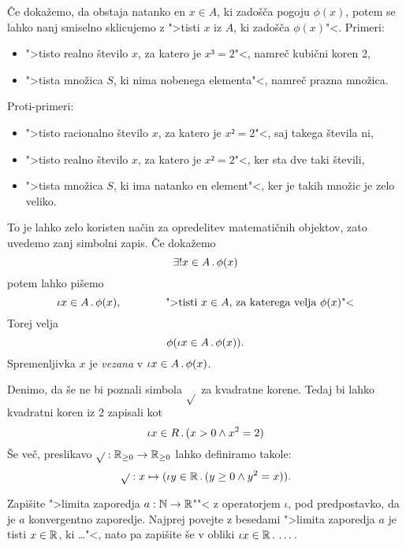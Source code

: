 Če dokažemo, da obstaja natanko en $x \in A$, ki zadošča pogoju $\phi(x)$, potem se lahko nanj smiselno sklicujemo z ">tisti $x$ iz $A$, ki zadošča $\phi(x)$"<. Primeri:
%
\begin{itemize}
\item ">tisto realno število $x$, za katero je $x³ = 2$"<, namreč kubični koren 2,
\item ">tista množica $S$, ki nima nobenega elementa"<, namreč prazna množica.
\end{itemize}
%
Proti-primeri:
%
\begin{itemize}
\item ">tisto racionalno število $x$, za katero je $x² = 2$"<, saj takega števila ni,
\item ">tisto realno število $x$, za katero je $x² = 2$"<, ker sta dve taki števili,
\item ">tista množica $S$, ki ima natanko en element"<, ker je takih množic je zelo veliko.
\end{itemize}
%
To je lahko zelo koristen način za opredelitev matematičnih objektov, zato uvedemo zanj simbolni zapis. Če dokažemo
%
\begin{equation*}
    \exists! x \in A \,.\, \phi(x)
\end{equation*}
%
potem lahko pišemo
%
\begin{equation*}
  \iota x \in A \,.\, \phi(x),
  \qquad\qquad\text{">tisti $x \in A$, za katerega velja $\phi(x)$"<}
\end{equation*}
%
Torej velja
%
\begin{equation*}
  \phi(\iota x \in A \,.\, \phi(x)).
\end{equation*}
%
Spremenljivka $x$ je \emph{vezana} v $\iota x \in A \,.\, \phi(x)$.

\begin{primer}
  Denimo, da še ne bi poznali simbola $\sqrt{}$ za kvadratne korene. Tedaj bi
  lahko kvadratni koren iz $2$ zapisali kot
  \begin{equation*}
    \iota x \in R \,.\, (x > 0 \land x^2 = 2)
  \end{equation*}
  Še več, preslikavo $\sqrt{} : \mathbb{R}_{\geq 0} \to \mathbb{R}_{\geq 0}$ lahko definiramo takole:
  \begin{equation*}
    \sqrt{} : x \mapsto (\iota y \in \mathbb{R} \,.\, (y \geq 0 \land y^2 = x)).
  \end{equation*}
\end{primer}

\begin{naloga}
  Zapišite ">limita zaporedja $a : \mathbb{N} \to \mathbb{R}$""< z operatorjem $\iota$, pod predpostavko,
  da je $a$ konvergentno zaporedje. Najprej povejte z besedami ">limita zaporedja $a$ je
  tisti $x \in \mathbb{R}$, ki \dots"<, nato pa zapišite še v obliki $\iota x \in \mathbb{R} \,.\, \dots$.
\end{naloga}


